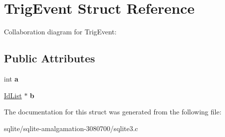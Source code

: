 \hypertarget{struct_trig_event}{\section{Trig\+Event Struct Reference}
\label{struct_trig_event}
}


Collaboration diagram for Trig\+Event\+:
\subsection*{Public Attributes}
\begin{DoxyCompactItemize}
\item 
\hypertarget{struct_trig_event_a19ac5a5e59e08350f72ec49cf8fccbb6}{int {\bfseries a}}\label{struct_trig_event_a19ac5a5e59e08350f72ec49cf8fccbb6}

\item 
\hypertarget{struct_trig_event_a86ef160cde95382e98b7934614e7f79f}{\hyperlink{struct_id_list}{Id\+List} $\ast$ {\bfseries b}}\label{struct_trig_event_a86ef160cde95382e98b7934614e7f79f}

\end{DoxyCompactItemize}


The documentation for this struct was generated from the following file\+:\begin{DoxyCompactItemize}
\item 
sqlite/sqlite-\/amalgamation-\/3080700/sqlite3.\+c\end{DoxyCompactItemize}
